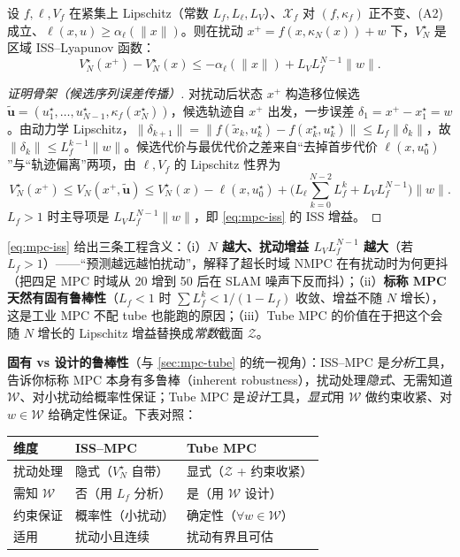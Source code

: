 \begin{theorem}
\label{thm:mpc-iss}
设 $f,\ell,V_f$ 在紧集上 Lipschitz（常数 $L_f,L_\ell,L_V$）、$\mathcal X_f$ 对 $(f,\kappa_f)$ 正不变、(A2) 成立、$\ell(x,u)\ge\alpha_\ell(\|x\|)$。则在扰动 $x^+=f(x,\kappa_N(x))+w$ 下，$V_N^\star$ 是区域 ISS--Lyapunov 函数：
\begin{equation}
  V_N^\star(x^+)-V_N^\star(x)\le-\alpha_\ell(\|x\|)+L_VL_f^{N-1}\|w\|.
  \label{eq:mpc-iss}
\end{equation}
\end{theorem}

\begin{proof}[证明骨架（候选序列误差传播）]
对扰动后状态 $x^+$ 构造移位候选 $\tilde{\mathbf u}=(u_1^\star,\dots,u_{N-1}^\star,\kappa_f(x_N^\star))$，候选轨迹自 $x^+$ 出发，一步误差 $\delta_1=x^+-x_1^\star=w$。由动力学 Lipschitz，$\|\delta_{k+1}\|=\|f(\tilde x_k,u_k^\star)-f(x_k^\star,u_k^\star)\|\le L_f\|\delta_k\|$，故 $\|\delta_k\|\le L_f^{k-1}\|w\|$。候选代价与最优代价之差来自“去掉首步代价 $\ell(x,u_0^\star)$”与“轨迹偏离”两项，由 $\ell,V_f$ 的 Lipschitz 性界为
\[
  V_N^\star(x^+)\le V_N(x^+,\tilde{\mathbf u})\le V_N^\star(x)-\ell(x,u_0^\star)+\Big(L_\ell\!\!\sum_{k=0}^{N-2}L_f^k+L_VL_f^{N-1}\Big)\|w\|.
\]
$L_f>1$ 时主导项是 $L_VL_f^{N-1}\|w\|$，即 \cref{eq:mpc-iss} 的 ISS 增益。
\end{proof}

\begin{insight}
\cref{eq:mpc-iss} 给出三条工程含义：（i）\textbf{$N$ 越大、扰动增益 $L_VL_f^{N-1}$ 越大}（若 $L_f>1$）——“预测越远越怕扰动”，解释了超长时域 NMPC 在有扰动时为何更抖（把四足 MPC 时域从 20 增到 50 后在 SLAM 噪声下反而抖）；（ii）\textbf{标称 MPC 天然有固有鲁棒性}（$L_f<1$ 时 $\sum L_f^k<1/(1-L_f)$ 收敛、增益不随 $N$ 增长），这是工业 MPC 不配 tube 也能跑的原因；（iii）Tube MPC 的价值在于把这个会随 $N$ 增长的 Lipschitz 增益替换成\emph{常数}截面 $\mathcal Z$。
\end{insight}

\begin{remark}
\textbf{固有 vs 设计的鲁棒性}（与 \cref{sec:mpc-tube} 的统一视角）：ISS--MPC 是\emph{分析}工具，告诉你标称 MPC 本身有多鲁棒（inherent robustness），扰动处理\emph{隐式}、无需知道 $\mathcal W$、对小扰动给概率性保证；Tube MPC 是\emph{设计}工具，\emph{显式}用 $\mathcal W$ 做约束收紧、对 $w\in\mathcal W$ 给确定性保证。下表对照：
\begin{center}\small
\begin{tabular}{lll}
\toprule
维度 & ISS--MPC & Tube MPC \\
\midrule
扰动处理 & 隐式（$V_N^\star$ 自带） & 显式（$\mathcal Z$ + 约束收紧） \\
需知 $\mathcal W$ & 否（用 $L_f$ 分析） & 是（用 $\mathcal W$ 设计） \\
约束保证 & 概率性（小扰动） & 确定性（$\forall w\in\mathcal W$） \\
适用 & 扰动小且连续 & 扰动有界且可估 \\
\bottomrule
\end{tabular}
\end{center}
\end{remark}

